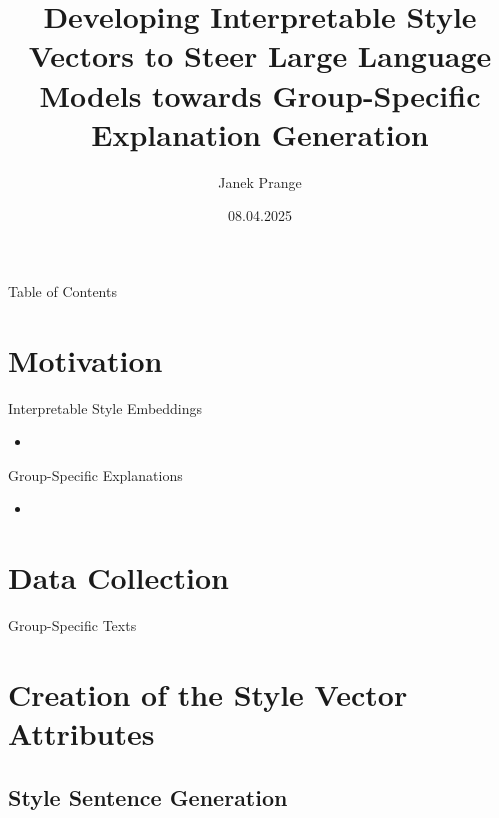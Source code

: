 \documentclass[t]{beamer}
\title[Master's Thesis Presentation]{Developing Interpretable Style Vectors to Steer Large Language Models towards Group-Specific Explanation Generation}
\date{08.04.2025}
\author[Prange]{Janek Prange}
\begin{document}
\begin{frame}
  \titlepage
\end{frame}

\begin{frame}{Table of Contents}
  \tableofcontents
\end{frame}


\section{Motivation}
\begin{frame}{Interpretable Style Embeddings}
  \begin{itemize}
    \item
  \end{itemize}
\end{frame}

\begin{frame}{Group-Specific Explanations}
  \begin{itemize}
    \item
  \end{itemize}
\end{frame}


\section{Data Collection}
\begin{frame}{Group-Specific Texts}

\end{frame}


\section{Creation of the Style Vector Attributes}
\subsection{Style Sentence Generation}
\begin{frame}{}

\end{frame}
\end{document}
